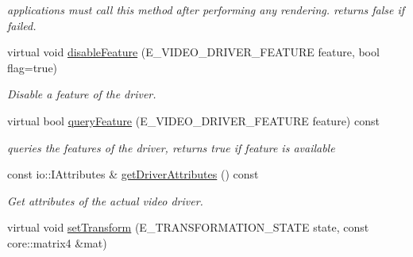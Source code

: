 \begin{DoxyCompactItemize}
\begin{DoxyCompactList}\small\item\em applications must call this method after performing any rendering. returns false if failed. \end{DoxyCompactList}\item 
\hypertarget{classirr_1_1video_1_1_c_null_driver_adde8614b9783cff5682db2844d1d2413}{virtual void \hyperlink{classirr_1_1video_1_1_c_null_driver_adde8614b9783cff5682db2844d1d2413}{disable\-Feature} (E\-\_\-\-V\-I\-D\-E\-O\-\_\-\-D\-R\-I\-V\-E\-R\-\_\-\-F\-E\-A\-T\-U\-R\-E feature, bool flag=true)}\label{classirr_1_1video_1_1_c_null_driver_adde8614b9783cff5682db2844d1d2413}

\begin{DoxyCompactList}\small\item\em Disable a feature of the driver. \end{DoxyCompactList}\item 
\hypertarget{classirr_1_1video_1_1_c_null_driver_af3ad88a76a5a69b322baad293f08ec72}{virtual bool \hyperlink{classirr_1_1video_1_1_c_null_driver_af3ad88a76a5a69b322baad293f08ec72}{query\-Feature} (E\-\_\-\-V\-I\-D\-E\-O\-\_\-\-D\-R\-I\-V\-E\-R\-\_\-\-F\-E\-A\-T\-U\-R\-E feature) const }\label{classirr_1_1video_1_1_c_null_driver_af3ad88a76a5a69b322baad293f08ec72}

\begin{DoxyCompactList}\small\item\em queries the features of the driver, returns true if feature is available \end{DoxyCompactList}\item 
\hypertarget{classirr_1_1video_1_1_c_null_driver_aeadb10b658d641b75978eccd0e6759f3}{const io\-::\-I\-Attributes \& \hyperlink{classirr_1_1video_1_1_c_null_driver_aeadb10b658d641b75978eccd0e6759f3}{get\-Driver\-Attributes} () const }\label{classirr_1_1video_1_1_c_null_driver_aeadb10b658d641b75978eccd0e6759f3}

\begin{DoxyCompactList}\small\item\em Get attributes of the actual video driver. \end{DoxyCompactList}\item 
\hypertarget{classirr_1_1video_1_1_c_null_driver_a6633a32966961700a64baa3ad47075bf}{virtual void \hyperlink{classirr_1_1video_1_1_c_null_driver_a6633a32966961700a64baa3ad47075bf}{set\-Transform} (E\-\_\-\-T\-R\-A\-N\-S\-F\-O\-R\-M\-A\-T\-I\-O\-N\-\_\-\-S\-T\-A\-T\-E state, const core\-::matrix4 \&mat)}\label{classirr_1_1video_1_1_c_null_driver_a6633a32966961700a64baa3ad47075bf}


\end{DoxyCompactItemize}
